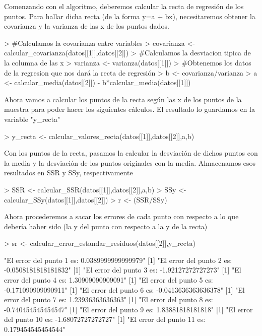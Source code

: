 \documentclass[parskip=full]{scrartcl}
\begin{document}
Comenzando con el algoritmo, deberemos calcular la recta de regresión de los puntos. Para hallar dicha recta (de la forma y=a + bx), necesitaremos obtener la covarianza y la varianza de las x de los puntos dados.


\begin{Schunk}
\begin{Sinput}
> #Calculamos la covarianza entre variables
> covarianza <- calcular_covarianza(datos[[1]],datos[[2]])
> #Calculamos la desviacion tipica de la columna de las x
> varianza <- varianza(datos[[1]])
> #Obtenemos los datos de la regresion que nos dará la recta de regresión
> b <- covarianza/varianza
> a <- calcular_media(datos[[2]]) - b*calcular_media(datos[[1]])
\end{Sinput}
\end{Schunk}


Ahora vamos a calcular los puntos de la recta según las x de los puntos de la muestra para poder hacer los siguientes cálculos. El resultado lo guardamos en la variable "y\_recta"


\begin{Schunk}
\begin{Sinput}
> y_recta <- calcular_valores_recta(datos[[1]],datos[[2]],a,b)
\end{Sinput}
\end{Schunk}


Con los puntos de la recta, pasamos la calcular la desviación de dichos puntos con la media y la desviación de los puntos originales con la media. Almacenamos esos resultados en SSR y SSy, respectivamente


\begin{Schunk}
\begin{Sinput}
> SSR <- calcular_SSR(datos[[1]],datos[[2]],a,b)
> SSy <- calcular_SSy(datos[[1]],datos[[2]])
> r <- (SSR/SSy)
\end{Sinput}
\end{Schunk}


Ahora procederemos a sacar los errores de cada punto con respecto a lo que debería haber sido (la y del punto con respecto a la y de la recta)


\begin{Schunk}
\begin{Sinput}
> sr <- calcular_error_estandar_residuos(datos[[2]],y_recta)
\end{Sinput}
\begin{Soutput}
[1] "El error del punto  1 es:  0.0389999999999979"
[1] "El error del punto  2 es:  -0.0508181818181832"
[1] "El error del punto  3 es:  -1.92127272727273"
[1] "El error del punto  4 es:  1.30909090909091"
[1] "El error del punto  5 es:  -0.171090909090911"
[1] "El error del punto  6 es:  -0.0413636363636378"
[1] "El error del punto  7 es:  1.23936363636363"
[1] "El error del punto  8 es:  -0.740454545454547"
[1] "El error del punto  9 es:  1.83881818181818"
[1] "El error del punto  10 es:  -1.68072727272727"
[1] "El error del punto  11 es:  0.179454545454544"
\end{Soutput}
\end{Schunk}
\end{document}
